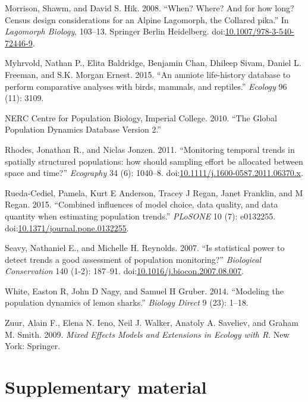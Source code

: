 \documentclass[12pt,]{article}
\begin{document}
\hypertarget{ref-Morrison2008}{}
Morrison, Shawm, and David S. Hik. 2008. ``When? Where? And for how
long? Census design considerations for an Alpine Lagomorph, the Collared
pika.'' In \emph{Lagomorph Biology}, 103--13. Springer Berlin
Heidelberg.
doi:\href{https://doi.org/10.1007/978-3-540-72446-9}{10.1007/978-3-540-72446-9}.

\hypertarget{ref-Myhrvold2015}{}
Myhrvold, Nathan P., Elita Baldridge, Benjamin Chan, Dhileep Sivam,
Daniel L. Freeman, and S.K. Morgan Ernest. 2015. ``An amniote
life-history database to perform comparative analyses with birds,
mammals, and reptiles.'' \emph{Ecology} 96 (11): 3109.

\hypertarget{ref-GPDD2010}{}
NERC Centre for Population Biology, Imperial College. 2010. ``The Global
Population Dynamics Database Version 2.''

\hypertarget{ref-Rhodes2011}{}
Rhodes, Jonathan R., and Niclas Jonzen. 2011. ``Monitoring temporal
trends in spatially structured populations: how should sampling effort
be allocated between space and time?'' \emph{Ecography} 34 (6): 1040--8.
doi:\href{https://doi.org/10.1111/j.1600-0587.2011.06370.x}{10.1111/j.1600-0587.2011.06370.x}.

\hypertarget{ref-Rueda-Cediel2015}{}
Rueda-Cediel, Pamela, Kurt E Anderson, Tracey J Regan, Janet Franklin,
and M Regan. 2015. ``Combined influences of model choice, data quality,
and data quantity when estimating population trends.'' \emph{PLoSONE} 10
(7): e0132255.
doi:\href{https://doi.org/10.1371/journal.pone.0132255}{10.1371/journal.pone.0132255}.

\hypertarget{ref-Seavy2007}{}
Seavy, Nathaniel E., and Michelle H. Reynolds. 2007. ``Is statistical
power to detect trends a good assessment of population monitoring?''
\emph{Biological Conservation} 140 (1-2): 187--91.
doi:\href{https://doi.org/10.1016/j.biocon.2007.08.007}{10.1016/j.biocon.2007.08.007}.

\hypertarget{ref-White2014}{}
White, Easton R, John D Nagy, and Samuel H Gruber. 2014. ``Modeling the
population dynamics of lemon sharks.'' \emph{Biology Direct} 9 (23):
1--18.

\hypertarget{ref-Zuur2009}{}
Zuur, Alain F., Elena N. Ieno, Neil J. Walker, Anatoly A. Saveliev, and
Graham M. Smith. 2009. \emph{Mixed Effects Models and Extensions in
Ecology with R}. New York: Springer.

\clearpage

\section{Supplementary material}\label{supplementary-material}
\end{document}
